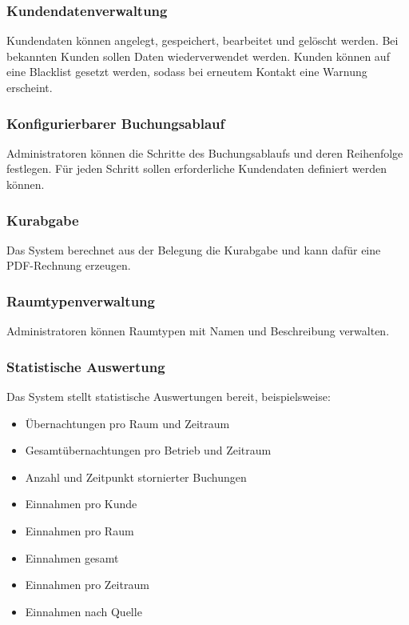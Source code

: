 \subsubsection{Kundendatenverwaltung}

Kundendaten können angelegt, gespeichert, bearbeitet und gelöscht werden. Bei bekannten Kunden sollen Daten wiederverwendet werden. Kunden können auf eine Blacklist gesetzt werden, sodass bei erneutem Kontakt eine Warnung erscheint.

\subsubsection{Konfigurierbarer Buchungsablauf}

Administratoren können die Schritte des Buchungsablaufs und deren Reihenfolge festlegen. Für jeden Schritt sollen erforderliche Kundendaten definiert werden können.

\subsubsection{Kurabgabe}

Das System berechnet aus der Belegung die Kurabgabe und kann dafür eine PDF-Rechnung erzeugen.

\subsubsection{Raumtypenverwaltung}

Administratoren können Raumtypen mit Namen und Beschreibung verwalten.

\subsubsection{Statistische Auswertung}

Das System stellt statistische Auswertungen bereit, beispielsweise:

\begin{itemize}
\item Übernachtungen pro Raum und Zeitraum
\item Gesamtübernachtungen pro Betrieb und Zeitraum
\item Anzahl und Zeitpunkt stornierter Buchungen
\item Einnahmen pro Kunde
\item Einnahmen pro Raum
\item Einnahmen gesamt
\item Einnahmen pro Zeitraum
\item Einnahmen nach Quelle
\end{itemize}

